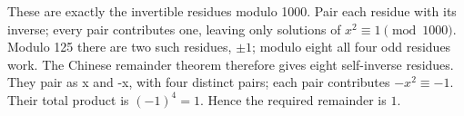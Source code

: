 These are exactly the invertible residues modulo 1000. Pair each residue with its inverse; every pair contributes one, leaving only solutions of $x^2\equiv1\pmod{1000}$. Modulo 125 there are two such residues, $\pm1$; modulo eight all four odd residues work. The Chinese remainder theorem therefore gives eight self-inverse residues. They pair as x and -x, with four distinct pairs; each pair contributes $-x^2\equiv-1$. Their total product is $(-1)^4=1$. Hence the required remainder is $\boxed1$.
